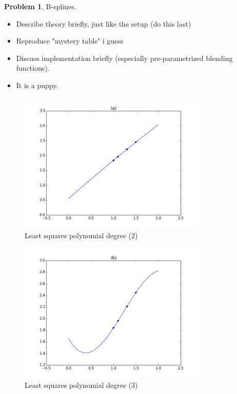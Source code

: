 \documentclass[10pt]{article}
\theoremstyle{plain}
\theoremstyle{definition}
\newtheorem{prob}{Problem}
\numberwithin{equation}{section}
\begin{document}
\begin{prob} B-splines.
    \begin{itemize}
        \item Describe theory briefly, just like the setup (do this last)
        \item Reproduce "mystery table" i guess
        \item Discuss implementation briefly (especially pre-parametrized blending functions).
        \item It is a puppy.
    \end{itemize}
\end{prob}


\begin{figure}[p]
    \begin{center}
        \includegraphics[width=0.8\textwidth]{p1_2}
        \caption{Least squares polynomial degree (2)}
    \end{center}
\end{figure}

\begin{figure}[p]
    \begin{center}
        \includegraphics[width=0.8\textwidth]{p1_3}
        \caption{Least squares polynomial degree (3)}
    \end{center}
\end{figure}
\end{document}
